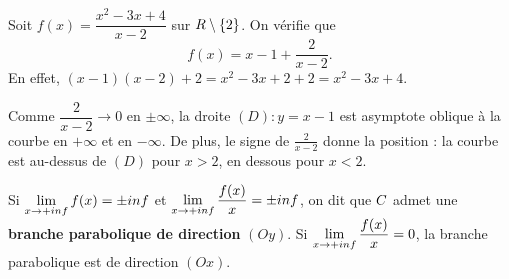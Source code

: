 \begin{exemple}
Soit $f(x) = \dfrac{x^{2}-3x+4}{x-2}$ sur $R\setminus\{2\}$. On vérifie que
\[
  f(x) = x-1+\frac{2}{x-2}.
\]
En effet, $(x-1)(x-2)+2 = x^{2}-3x+2+2 = x^{2}-3x+4$. \checkmark

Comme $\dfrac{2}{x-2} \to 0$ en $\pm\infty$, la droite $(D) : y = x-1$ est
asymptote oblique à la courbe en $+\infty$ et en $-\infty$. De plus, le
signe de $\frac{2}{x-2}$ donne la position : la courbe est au-dessus de
$(D)$ pour $x > 2$, en dessous pour $x < 2$.
\end{exemple}

\begin{definition}
Si $\limpinf f(x) = \pm\infty$ et $\limpinf \dfrac{f(x)}{x} = \pm\infty$, on
dit que $C$ admet une \textbf{branche parabolique de direction} $(Oy)$.
Si $\limpinf \dfrac{f(x)}{x} = 0$, la branche parabolique est de direction
$(Ox)$.
\end{definition}

